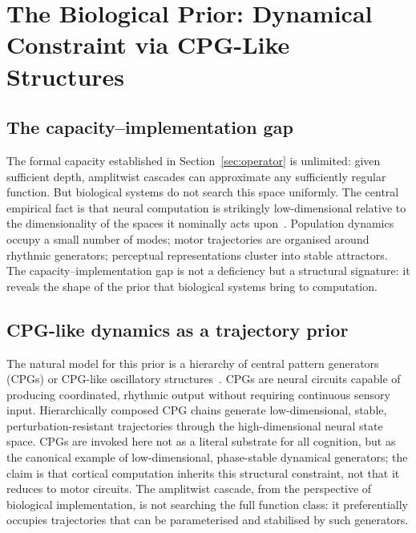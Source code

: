 \documentclass[12pt, a4paper]{article}
\theoremstyle{remark}
\theoremstyle{definition}
\begin{document}
\section{The Biological Prior: Dynamical Constraint via CPG-Like Structures}
\label{sec:prior}

\subsection{The capacity--implementation gap}

The formal capacity established in Section~\ref{sec:operator} is unlimited: given
sufficient depth, amplitwist cascades can approximate any sufficiently regular function.
But biological systems do not search this space uniformly.  The central empirical fact is
that neural computation is strikingly low-dimensional relative to the dimensionality of the
spaces it nominally acts upon~\cite{churchland2012neural,gallego2017neural}.  Population dynamics occupy a small number of modes; motor
trajectories are organised around rhythmic generators; perceptual representations cluster
into stable attractors.  The capacity--implementation gap is not a deficiency but a
structural signature: it reveals the shape of the prior that biological systems bring to
computation.

\subsection{CPG-like dynamics as a trajectory prior}

The natural model for this prior is a hierarchy of central pattern generators (CPGs) or
CPG-like oscillatory structures~\cite{marder2001central,izhikevich2007dynamical}.  CPGs are neural circuits capable of producing
coordinated, rhythmic output without requiring continuous sensory input.  Hierarchically
composed CPG chains generate low-dimensional, stable, perturbation-resistant trajectories
through the high-dimensional neural state space.  CPGs are invoked here not as a literal
substrate for all cognition, but as the canonical example of low-dimensional, phase-stable
dynamical generators; the claim is that cortical computation inherits this structural
constraint, not that it reduces to motor circuits.  The amplitwist cascade, from the
perspective of biological implementation, is not searching the full function class: it
preferentially occupies trajectories that can be parameterised and stabilised by such
generators.
\end{document}
